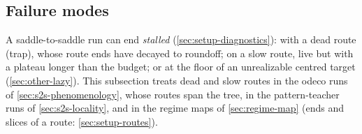 \subsection{Failure modes}\label{sec:s2s-failure}

A saddle-to-saddle run can end \emph{stalled} (\cref{sec:setup-diagnostics}): with a dead route (trap), whose
route ends have decayed to roundoff; on a slow route, live but with a plateau longer than the budget; or at the
floor of an unrealizable centred target (\cref{sec:other-lazy}). This subsection treats dead and slow routes in the
odeco runs of \cref{sec:s2s-phenomenology}, whose routes span the tree, in the pattern-teacher runs of
\cref{sec:s2s-locality}, and in the regime maps of \cref{sec:regime-map} (ends and slices of a route:
\cref{sec:setup-routes}).

